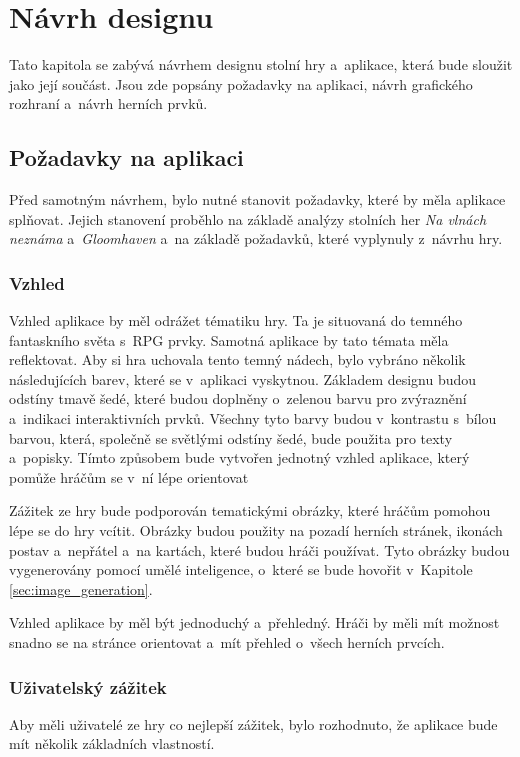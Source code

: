 \chapter{Návrh designu}
Tato kapitola se zabývá návrhem designu stolní hry a~aplikace, která bude sloužit jako její součást. Jsou zde popsány požadavky na aplikaci, návrh grafického rozhraní a~návrh herních prvků.

\section{Požadavky na aplikaci}
Před samotným návrhem, bylo nutné stanovit požadavky, které by měla aplikace splňovat. Jejich stanovení proběhlo na základě analýzy stolních her \textit{Na vlnách neznáma} a~\textit{Gloomhaven} a~na základě požadavků, které vyplynuly z~návrhu hry.

\subsection{Vzhled}
Vzhled aplikace by měl odrážet tématiku hry. Ta je situovaná do temného fantaskního světa s~RPG prvky. Samotná aplikace by tato témata měla reflektovat. Aby si hra uchovala tento temný nádech, bylo vybráno několik následujících barev, které se v~aplikaci vyskytnou. Základem designu budou odstíny tmavě šedé, které budou doplněny o~zelenou barvu pro zvýraznění a~indikaci interaktivních prvků. Všechny tyto barvy budou v~kontrastu s~bílou barvou, která, společně se světlými odstíny šedé, bude použita pro texty a~popisky. Tímto způsobem bude vytvořen jednotný vzhled aplikace, který pomůže hráčům se v~ní lépe orientovat

Zážitek ze hry bude podporován tematickými obrázky, které hráčům pomohou lépe se do hry vcítit. Obrázky budou použity na pozadí herních stránek, ikonách postav a~nepřátel a~na kartách, které budou hráči používat. Tyto obrázky budou vygenerovány pomocí umělé inteligence, o~které se bude hovořit v~Kapitole \ref{sec:image_generation}.

Vzhled aplikace by měl být jednoduchý a~přehledný. Hráči by měli mít možnost snadno se na stránce orientovat a~mít přehled o~všech herních prvcích.

\subsection{Uživatelský zážitek}
Aby měli uživatelé ze hry co nejlepší zážitek, bylo rozhodnuto, že aplikace bude mít několik základních vlastností.

